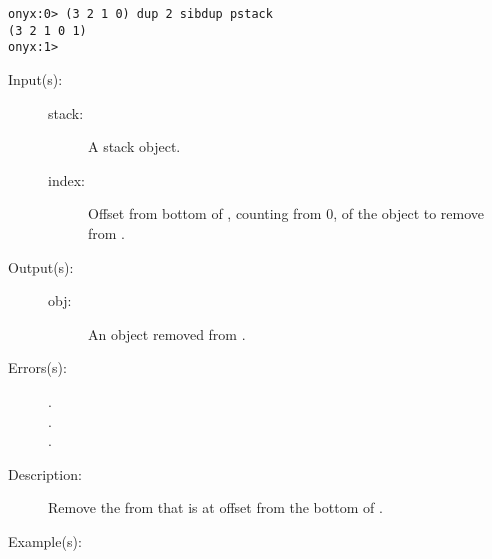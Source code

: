 \begin{description}
\begin{description}
\begin{verbatim}
onyx:0> (3 2 1 0) dup 2 sibdup pstack
(3 2 1 0 1)
onyx:1>
		\end{verbatim}
	\end{description}
\label{systemdict:sibpop}
\item[{\onyxop{stack index}{sibpop}{obj}}: ]
	\begin{description}\item[]
	\item[Input(s): ]
		\begin{description}\item[]
		\item[stack: ]
			A stack object.
		\item[index: ]
			Offset from bottom of , counting from 0, of
			the object to remove from .
		\end{description}
	\item[Output(s): ]
		\begin{description}\item[]
		\item[obj: ]
			An object removed from .
		\end{description}
	\item[Errors(s): ]
		\begin{description}\item[]
		\item[.]
		\item[.]
		\item[.]
		\end{description}
	\item[Description: ]
		Remove the  from  that is at offset
		 from the bottom of .
	\item[Example(s): ]\begin{verbatim}


\end{verbatim}
\end{description}
\end{description}
